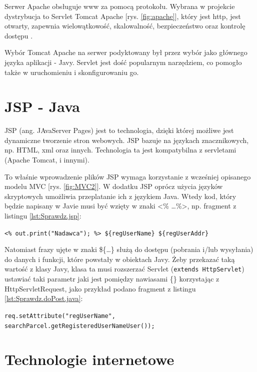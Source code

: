 \documentclass[eng,printmode,oneside]{mgr}
\begin{document}
Serwer Apache obsługuje www za pomocą protokołu. Wybrana w projekcie dystrybucja
to Servlet Tomcat Apache [rys. \ref{fig:apache}], który jest http, jest otwarty,
zapewnia wielowątkowość, skalowalność, bezpieczeństwo oraz kontrolę dostępu
\cite{apache.wiki}.

Wybór Tomcat Apache na serwer podyktowany był przez wybór jako głównego języka
aplikacji - Javy. Servlet jest dość popularnym narzędziem, co pomogło także w
uruchomieniu i skonfigurowaniu go.

\section{JSP - Java}

JSP (ang. JAvaServer Pages) jest to technologia, dzięki której możliwe jest
dynamiczne tworzenie stron webowych. JSP bazuje na językach znacznikowych, np.
HTML, xml oraz innych. Technologia ta jest kompatybilna z servletami (Apache
Tomcat, i innymi).

To właśnie wprowadzenie plików JSP wymaga korzystanie z wcześniej
opisanego modelu MVC [rys. \ref{fig:MVC2}]. W dodatku JSP oprócz użycia języków
skryptowych umożliwia przeplatanie ich z językiem Java. Wtedy kod, który będzie
napisany w Javie musi być wzięty w znaki <\% \ldots \%>, np. fragment z listingu
\ref{lst:Sprawdz.jsp}:

\texttt{<\% out.print("Nadawca"); \%> \$\{regUserName\}
\$\{regUserAddr\}}

Natomiast frazy ujęte w znaki \$\{\ldots\} służą do dostępu (pobrania
i/lub wysyłania) do danych i funkcji, które powstały w obiektach Javy. Żeby
przekazać taką wartość z klasy Javy, klasa ta musi rozszerzać Servlet
(\texttt{extends HttpServlet}) ustawiać taki parametr jaki jest pomiędzy
nawiasami \{\} korzystając z HttpServletRequest, jako przykład podano fragment z
listingu \ref{lst:Sprawdz.doPost.java}:

\texttt{req.setAttribute("regUserName",
						searchParcel.getRegisteredUserNameUser());}

\section{Technologie internetowe}
\end{document}
